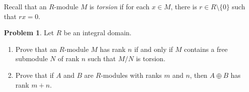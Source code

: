 \documentclass[letterpaper,11pt]{amsart}
\theoremstyle{plain}
\theoremstyle{definition}
\newtheorem{pr}{Problem}
\theoremstyle{remark}
\begin{document}
\vspace{.5cm}



Recall that an $R$-module $M$ is \emph{torsion} if for each $x \in M$, there is $r \in R\setminus\{0\}$ such that $rx = 0$. 

\begin{pr}
    Let $R$ be an integral domain.
    \begin{enumerate}
        \item Prove that an $R$-module $M$ has rank $n$ if and only if $M$ contains a free submodule $N$ of rank $n$ such that $M/N$ is torsion.
        \item Prove that if $A$ and $B$ are $R$-modules with ranks $m$ and $n$, then $A \oplus B$ has rank $m+n$.
    \end{enumerate}
\end{pr}
\end{document}
